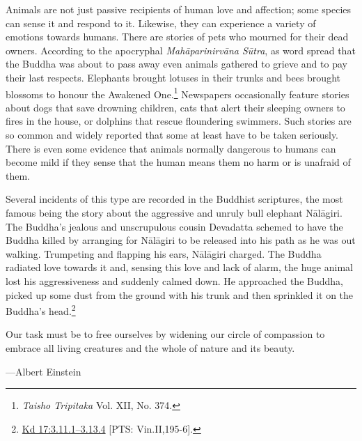 \documentclass[10pt, openright]{book}
\newenvironment{epigram-2}%
{%
\vspace{1em}
\noindent
\quoting[leftmargin=2.5cm,rightmargin=2.5cm]%
\begin{itshape}
\large
}%
{\end{itshape}\endquoting
}%
\newenvironment{epigram-2-cite}%
{%
\quoting[leftmargin=2.5cm,rightmargin=2.5cm]%
\noindent\normal\hspace*{\fill} 
}%
{\endquoting\vspace{1em}
}%
\begin{document}
Animals are not just passive recipients of human love and affection; some species can sense it and respond to it. Likewise, they can experience a variety of emotions towards humans. There are stories of pets who mourned for their dead owners. According to the apocryphal \textit{Mahāparinirvāna Sūtra}, as word spread that the Buddha was about to pass away even animals gathered to grieve and to pay their last respects. Elephants brought lotuses in their trunks and bees brought blossoms to honour the Awakened One.\footnote {\textit{Taisho Tripitaka} Vol. XII, No. 374.} Newspapers occasionally feature stories about dogs that save drowning children, cats that alert their sleeping owners to fires in the house, or dolphins that rescue floundering swimmers. Such stories are so common and widely reported that some at least have to be taken seriously. There is even some evidence that animals normally dangerous to humans can become mild if they sense that the human means them no harm or is unafraid of them.


Several incidents of this type are recorded in the Buddhist scriptures, the most famous being the story about the aggressive and unruly bull elephant Nālāgiri. The Buddha’s jealous and unscrupulous cousin Devadatta schemed to have the Buddha killed by arranging for Nālāgiri to be released into his path as he was out walking. Trumpeting and flapping his ears, Nālāgiri charged. The Buddha radiated love towards it and, sensing this love and lack of alarm, the huge animal lost his aggressiveness and suddenly calmed down. He approached the Buddha, picked up some dust from the ground with his trunk and then sprinkled it on the Buddha’s head.\footnote {\href{https://suttacentral.net/pli-tv-kd17/en/brahmali#3.11.1}{Kd 17:3.11.1–3.13.4} [PTS: Vin.II,195-6].}


\begin{epigram-2}
Our task must be to free ourselves by widening our circle of compassion to embrace all living creatures and the whole of nature and its beauty.
\end{epigram-2}

\begin{epigram-2-cite}
—Albert Einstein
\end{epigram-2-cite}
\end{document}
